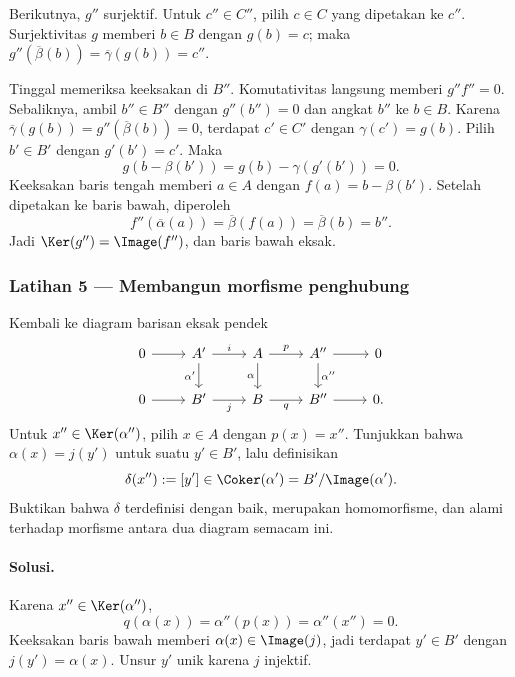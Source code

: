 Berikutnya, $g''$ surjektif. Untuk $c''\in C''$, pilih $c\in C$ yang
dipetakan ke $c''$. Surjektivitas $g$ memberi $b\in B$ dengan $g(b)=c$; maka
$g''(\overline\beta(b))=\overline\gamma(g(b))=c''$.

Tinggal memeriksa keeksakan di $B''$. Komutativitas langsung memberi
$g''f''=0$. Sebaliknya, ambil $b''\in B''$ dengan $g''(b'')=0$ dan angkat
$b''$ ke $b\in B$. Karena
$\overline\gamma(g(b))=g''(\overline\beta(b))=0$, terdapat $c'\in C'$
dengan $\gamma(c')=g(b)$. Pilih $b'\in B'$ dengan $g'(b')=c'$. Maka
\[
	g(b-\beta(b'))=g(b)-\gamma(g'(b'))=0.
\]
Keeksakan baris tengah memberi $a\in A$ dengan
$f(a)=b-\beta(b')$. Setelah dipetakan ke baris bawah, diperoleh
\[
	f''(\overline\alpha(a))
	=\overline\beta(f(a))
	=\overline\beta(b)=b''.
\]
Jadi $\Ker(g'')=\Image(f'')$, dan baris bawah eksak.

\subsubsection*{Latihan 5 --- Membangun morfisme penghubung}
\hypertarget{o014.mastery.diagram-chasing.001.ex05}{ }
\label{mastery:diagram-chasing-001-ex05}

Kembali ke diagram barisan eksak pendek
\[
\begin{tikzcd}
	0 \arrow[r] & A' \arrow[r, "i"] \arrow[d, "\alpha'"'] & A \arrow[r, "p"] \arrow[d, "\alpha"'] & A'' \arrow[r] \arrow[d, "\alpha''"] & 0 \\
	0 \arrow[r] & B' \arrow[r, "j"'] & B \arrow[r, "q"'] & B'' \arrow[r] & 0.
\end{tikzcd}
\]
Untuk $x''\in\Ker(\alpha'')$, pilih $x\in A$ dengan $p(x)=x''$.
Tunjukkan bahwa $\alpha(x)=j(y')$ untuk suatu $y'\in B'$, lalu definisikan
\[
	\delta(x''):=[y']\in\Coker(\alpha')=B'/\Image(\alpha').
\]
Buktikan bahwa $\delta$ terdefinisi dengan baik, merupakan homomorfisme, dan
alami terhadap morfisme antara dua diagram semacam ini.

\paragraph{Solusi.}
\hypertarget{o014.mastery.diagram-chasing.001.sol05}{ }
Karena $x''\in\Ker(\alpha'')$,
\[
	q(\alpha(x))=\alpha''(p(x))=\alpha''(x'')=0.
\]
Keeksakan baris bawah memberi $\alpha(x)\in\Image(j)$, jadi terdapat
$y'\in B'$ dengan $j(y')=\alpha(x)$. Unsur $y'$ unik karena $j$ injektif.

